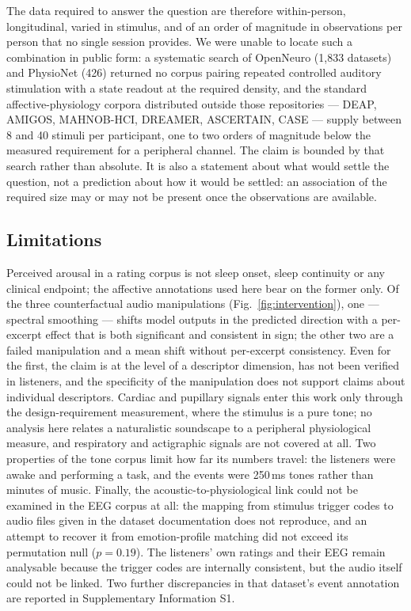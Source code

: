 The data required to answer the question are therefore within-person,
longitudinal, varied in stimulus, and of an order of magnitude in observations per
person that no single session provides. We were unable to locate such a
combination in public form: a systematic search of OpenNeuro (1,833 datasets) and
PhysioNet (426) returned no corpus pairing repeated controlled auditory
stimulation with a state readout at the required density, and the standard
affective-physiology corpora distributed outside those repositories --- DEAP,
AMIGOS, MAHNOB-HCI, DREAMER, ASCERTAIN, CASE --- supply between 8 and 40 stimuli
per participant, one to two orders of magnitude below the measured requirement for
a peripheral channel. The claim is bounded by that search rather than absolute.
It is also a statement about what would settle the question, not a prediction
about how it would be settled: an association of the required size may or may not
be present once the observations are available.

\subsection*{Limitations}

Perceived arousal in a rating corpus is not sleep onset, sleep continuity or any
clinical endpoint; the affective annotations used here bear on the former only.
Of the three counterfactual audio manipulations (Fig.~\ref{fig:intervention}), one
--- spectral smoothing --- shifts model outputs in the predicted direction with a
per-excerpt effect that is both significant and consistent in sign; the other two
are a failed manipulation and a mean shift without per-excerpt consistency. Even
for the first, the claim is at the level of a descriptor dimension, has not been
verified in listeners, and the specificity of the manipulation does not support
claims about individual descriptors. Cardiac and pupillary signals
enter this work only through the design-requirement measurement, where the
stimulus is a pure tone; no analysis here relates a naturalistic soundscape to a
peripheral physiological measure, and respiratory and actigraphic signals are not
covered at all. Two properties of the tone corpus limit how far its numbers
travel: the listeners were awake and performing a task, and the events were
250\,ms tones rather than minutes of music. Finally, the acoustic-to-physiological
link
could not be examined in the EEG corpus at all: the mapping from stimulus trigger
codes to audio files given in the dataset documentation does not reproduce, and an
attempt to recover it from emotion-profile matching did not exceed its permutation
null ($p = 0.19$). The listeners' own ratings and their EEG remain analysable
because the trigger codes are internally consistent, but the audio itself could not
be linked. Two further discrepancies in that dataset's event annotation are
reported in Supplementary Information S1.

